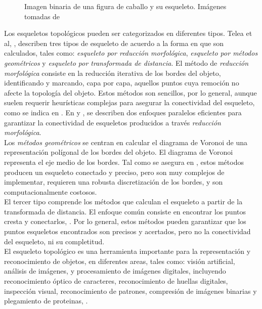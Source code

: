 \begin{figure}[h t b p ! H]
  \centering
\qquad
  \caption[Imagen binaria de una figura de caballo y su esqueleto]{Imagen binaria de una figura de
caballo y su esqueleto. Im\'agenes tomadas de \cite{ssm}}
  \label{fig:genskeleton}
\end{figure}


Los esqueletos topol\'ogicos pueden ser categorizados en diferentes tipos.
Telea et al, \cite{augmented}, describen tres tipos de esqueleto de acuerdo a la forma en que
son calculados, tales como: \emph{esqueleto por reducci\'on morfol\'ogica}, 
\emph{esqueleto por m\'etodos geom\'etricos} y \emph{esqueleto por transformada de distancia}.
El m\'etodo de \emph{reducci\'on morfol\'ogica} consiste en la reducci\'on iterativa de los bordes
del objeto, identificando y marcando, capa por capa, aquellos puntos cuya remoci\'on no afecte
la topolog\'ia del objeto. Estos m\'etodos son sencillos, por lo general, aunque suelen requerir
heur\'isticas complejas para asegurar la conectividad del esqueleto, como se indica en
\cite{augmented}. En \cite{onepass} y \cite{thinning}, se describen dos enfoques paralelos
eficientes para garantizar la conectividad de esqueletos producidos a trav\'es 
\emph{reducci\'on morfol\'ogica}.\\
Los \emph{m\'etodos geom\'etricos} se centran en calcular el diagrama de Voronoi de una
representaci\'on pol\'igonal de los bordes del objeto. El diagrama de Voronoi representa
el eje medio de los bordes. Tal como se asegura en \cite[p.251]{augmented}, estos m\'etodos
producen un esqueleto conectado y preciso, pero son muy complejos de implementar, requieren
una robusta discretizaci\'on de los bordes, y son computacionalmente costosos.\\
El tercer tipo comprende los m\'etodos que calculan el esqueleto a partir de 
la transformada de distancia. El enfoque com\'un consiste en encontrar los puntos cresta
y conectarlos, \cite{maxima, euclideancentre, ridgedt}. Por lo general, estos m\'etodos
pueden garantizar que los puntos esqueletos encontrados son precisos y acertados, 
pero no la conectividad del esqueleto, ni su completitud.\\

El esqueleto topol\'ogico es una herramienta importante para la representaci\'on
y reconocimiento de objetos, en diferentes areas, tales como: visi\'on artificial,
an\'alisis de im\'agenes, y procesamiento de im\'agenes digitales, incluyendo 
reconocimiento \'optico de caracteres, reconocimiento de huellas digitales, inspecci\'on
visual, reconocimiento de patrones, compresi\'on de im\'agenes binarias y plegamiento
de proteinas, \cite{skprotein}.


